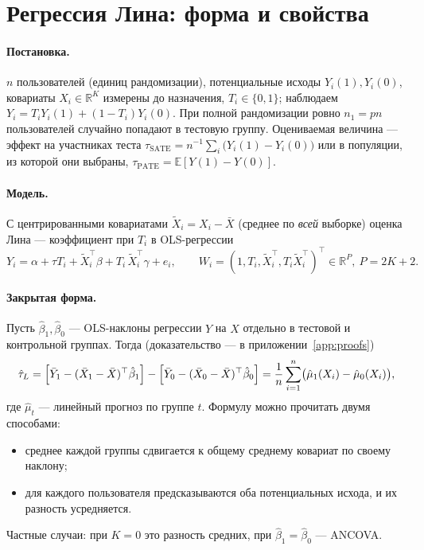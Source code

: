 \documentclass[10pt,a4paper]{article}
\newcommand{\E}{\mathbb{E}}
\newcommand{\T}{^{\top}}
\begin{document}
\section{Регрессия Лина: форма и свойства}\label{sec:lin}

\paragraph{Постановка.} $n$ пользователей (единиц рандомизации), потенциальные исходы $Y_i(1),Y_i(0)$,
ковариаты $X_i\in\mathbb R^K$ измерены до назначения, $T_i\in\{0,1\}$; наблюдаем
$Y_i=T_iY_i(1)+(1-T_i)Y_i(0)$. При полной рандомизации ровно $n_1=pn$ пользователей случайно попадают в
тестовую группу. Оцениваемая величина --- эффект на участниках теста
$\tau_{\text{SATE}}=n^{-1}\sum_i\bigl(Y_i(1)-Y_i(0)\bigr)$ или в популяции, из которой они выбраны,
$\tau_{\text{PATE}}=\E[Y(1)-Y(0)]$.

\paragraph{Модель.} С центрированными ковариатами $\tilde X_i=X_i-\bar X$ (среднее по \emph{всей} выборке)
оценка Лина --- коэффициент при $T_i$ в OLS-регрессии
\begin{equation}\label{eq:lin}
Y_i=\alpha+\tau T_i+\tilde X_i\T\beta+T_i\,\tilde X_i\T\gamma+e_i ,
\qquad W_i=(1,T_i,\tilde X_i\T,T_i\tilde X_i\T)\T\in\mathbb R^{P},\ P=2K+2 .
\end{equation}

\paragraph{Закрытая форма.} Пусть $\hat\beta_1,\hat\beta_0$ --- OLS-наклоны регрессии $Y$ на $X$ отдельно в
тестовой и контрольной группах. Тогда (доказательство --- в приложении~\ref{app:proofs})
\begin{equation}\label{eq:closed}
\hat\tau_L=\Bigl[\bar Y_1-(\bar X_1-\bar X)\T\hat\beta_1\Bigr]-\Bigl[\bar Y_0-(\bar X_0-\bar X)\T\hat\beta_0\Bigr]
=\frac1n\sum_{i=1}^n\bigl(\hat\mu_1(X_i)-\hat\mu_0(X_i)\bigr),
\end{equation}
где $\hat\mu_t$ --- линейный прогноз по группе $t$. Формулу можно прочитать двумя способами:
\begin{itemize}
  \item среднее каждой группы сдвигается к общему среднему ковариат по своему наклону;
  \item для каждого пользователя предсказываются оба потенциальных исхода, и их разность усредняется.
\end{itemize}
Частные случаи: при $K=0$ это разность средних, при $\hat\beta_1=\hat\beta_0$ --- ANCOVA.
\end{document}
